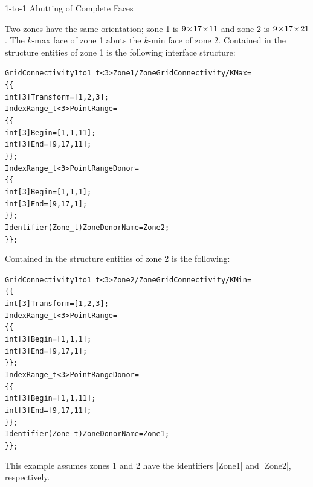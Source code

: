 \begin{example}{1-to-1 Abutting of Complete Faces}
\label{ex:struct_1to1}

Two zones have the same orientation; zone 1 is $9\!\times\! 17\!\times\! 11$ and 
zone 2 is $9\!\times\! 17\!\times\! 21$.
The $k$-max face of zone 1 abuts the $k$-min face of zone 2.
Contained in the structure entities of zone 1 is the following interface
structure:
\begin{alltt}
  GridConnectivity1to1\_t<3> Zone1/ZoneGridConnectivity/KMax =
    \{\{
    int[3] Transform = [1,2,3] ;
    IndexRange\_t<3> PointRange =
      \{\{
      int[3] Begin = [1,1,11] ;
      int[3] End   = [9,17,11] ;
      \}\} ;
    IndexRange\_t<3> PointRangeDonor =
      \{\{
      int[3] Begin = [1,1,1] ; 
      int[3] End   = [9,17,1] ;
      \}\} ;
    Identifier(Zone\_t) ZoneDonorName = Zone2 ;
    \}\} ;
\end{alltt}
Contained in the structure entities of zone 2 is the following:
\begin{alltt}
  GridConnectivity1to1\_t<3> Zone2/ZoneGridConnectivity/KMin =
    \{\{
    int[3] Transform = [1,2,3] ;
    IndexRange\_t<3> PointRange =
      \{\{
      int[3] Begin = [1,1,1] ; 
      int[3] End   = [9,17,1] ;
      \}\} ;
    IndexRange\_t<3> PointRangeDonor =
      \{\{
      int[3] Begin = [1,1,11] ;
      int[3] End   = [9,17,11] ;
      \}\} ;
    Identifier(Zone\_t) ZoneDonorName = Zone1 ;
    \}\} ;
\end{alltt}
\end{example}
This example assumes zones 1 and 2 have the identifiers |Zone1| and |Zone2|,
respectively.    


